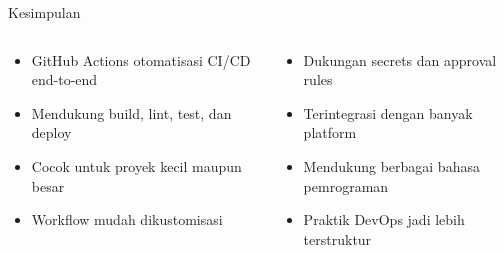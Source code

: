 \documentclass[aspectratio=169, table]{beamer}
\begin{document}
\begin{frame}[fragile]{Kesimpulan}
	\vspace{20pt}
	
	\begin{columns}[T]
		\begin{column}{0.5\textwidth}
			\begin{itemize}
				\item GitHub Actions otomatisasi CI/CD end-to-end
				\item Mendukung build, lint, test, dan deploy
				\item Cocok untuk proyek kecil maupun besar
				\item Workflow mudah dikustomisasi
			\end{itemize}
		\end{column}
		
		\begin{column}{0.5\textwidth}
			\begin{itemize}
				\item Dukungan secrets dan approval rules
				\item Terintegrasi dengan banyak platform
				\item Mendukung berbagai bahasa pemrograman
				\item Praktik DevOps jadi lebih terstruktur
			\end{itemize}
		\end{column}
	\end{columns}
	
\end{frame}
\end{document}
